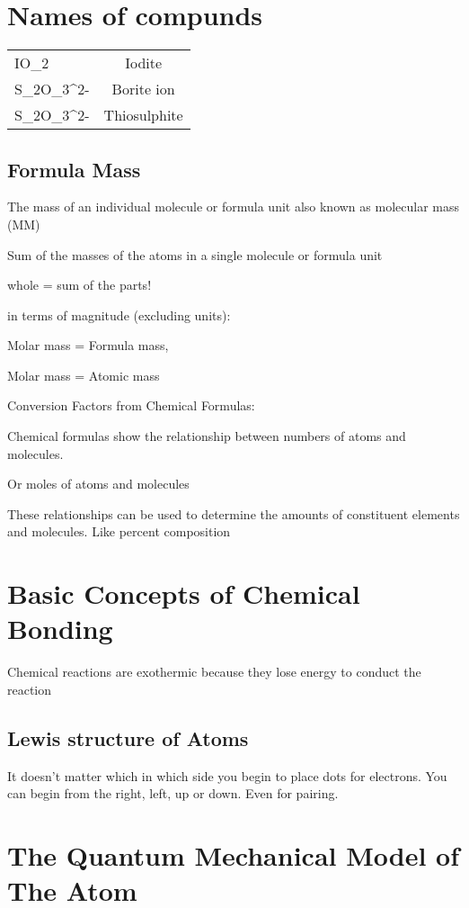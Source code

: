 \documentclass[openany]{book}
\begin{document}
\chapter{Names of compunds}

\begin{tabular}{L c}
	IO_2        & Iodite       \\
	S_2O_3^{2-} & Borite ion   \\
	S_2O_3^{2-} & Thiosulphite \\
\end{tabular}

\section{Formula Mass}

The mass of an individual molecule or formula unit also known as molecular mass (MM)

Sum of the masses of the atoms in a single molecule or formula unit

whole = sum of the parts!

in terms of magnitude (excluding units):

Molar mass = Formula mass,

Molar mass = Atomic mass

Conversion Factors from Chemical Formulas:

Chemical formulas show the relationship between numbers of atoms
and molecules.

Or moles of atoms and molecules

These relationships can be used to determine the amounts of
constituent elements and molecules.
Like percent composition


\chapter{Basic Concepts of Chemical Bonding}

Chemical reactions are exothermic because they lose energy to conduct the reaction

\section{Lewis structure of Atoms}

It doesn't matter which in which side you begin to place dots for electrons. You can begin from the right, left, up or down. Even for pairing.

\chapter{The Quantum Mechanical Model of The Atom}\label{chap:The Quantum Mechanical Model of The Atom} %
\end{document}
